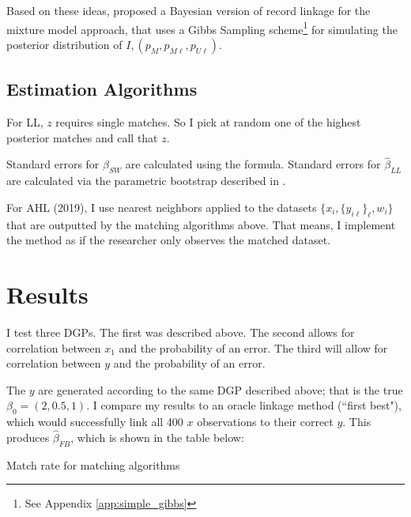 \documentclass[12pt]{article}
\newcommand\params{(p_M, p_{M\ell}, p_{U\ell})}
\begin{document}
\begin{enumerate}
Based on these ideas, \cite{larsen_rubin_2001} proposed a Bayesian version of record linkage for the mixture model approach, that uses a Gibbs Sampling scheme\footnote{See Appendix \ref{app:simple_gibbs}} for simulating the posterior distribution of $I,\params$. 



\subsection{Estimation Algorithms}  

For LL, $z$ requires single matches.  So I pick at random one of the highest posterior matches and call that $z$. 

Standard errors for $\hat{\beta}_{SW}$ are calculated using the formula. 
Standard errors for $\hat{\beta}_{LL}$ are calculated via the parametric bootstrap described in \cite{lahiri05}.  


For AHL (2019), I use nearest neighbors applied to the datasets $\{x_i, \{y_{i\ell}\}_\ell, w_i \}$ that are outputted by the matching algorithms above.  That means, I implement the method as if the researcher only observes the matched dataset.  

\section{Results}
I test three DGPs. The first was described above.  The second allows for correlation  between $x_1$ and the probability of an error.  The third will allow for correlation between $y$ and the probability of an error. 

The $y$ are generated according to the same DGP described above; that is the true $\beta_0 = (2, 0.5, 1)$.  I compare my results to an oracle linkage method (``first best"), which would successfully link all 400 $x$ observations to their correct $y$.  This produces $\hat{\beta}_{FB}$, which is shown in the table below:

\begin{table}[h!]
\let\center\empty
\let\endcenter\relax
\centering
\caption{Match rate for matching algorithms}
\vspace{10pt}
\resizebox{0.6\textwidth}{!}{}
\end{table}


\end{enumerate}
\end{document}
